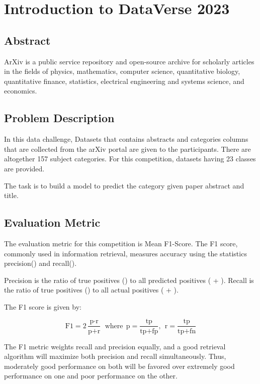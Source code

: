 
\chapter{Introduction to DataVerse 2023}
\section{Abstract}
ArXiv is a public service repository and open-source archive for scholarly articles in the fields of physics, mathematics, computer science, quantitative biology, quantitative finance, statistics, electrical engineering and systems science, and economics.

\section{Problem Description}
In this data challenge, Datasets that contains abstracts and categories columns that are collected from the arXiv portal are given to the participants. There are altogether 157 subject categories. For this competition, datasets having 23 classes are provided.

The task is to build a model to predict the category given paper abstract and title.

\section{Evaluation Metric}
The evaluation metric for this competition is Mean F1-Score. The F1 score, commonly used in information retrieval, measures accuracy using the statistics precision() and recall().

Precision is the ratio of true positives () to all predicted positives ( + ). Recall is the ratio of true positives () to all actual positives ( + ).

The F1 score is given by:

\[ \text{F1} = 2\frac{\text{p} \cdot \text{r}}{\text{p}+\text{r}}\ \ \mathrm{where}\ \ \text{p} = \frac{\text{tp}}{\text{tp}+\text{fp}},\ \ \text{r} = \frac{\text{tp}}{\text{tp}+\text{fn}} \]

The F1 metric weights recall and precision equally, and a good retrieval algorithm will maximize both precision and recall simultaneously. Thus, moderately good performance on both will be favored over extremely good performance on one and poor performance on the other.




